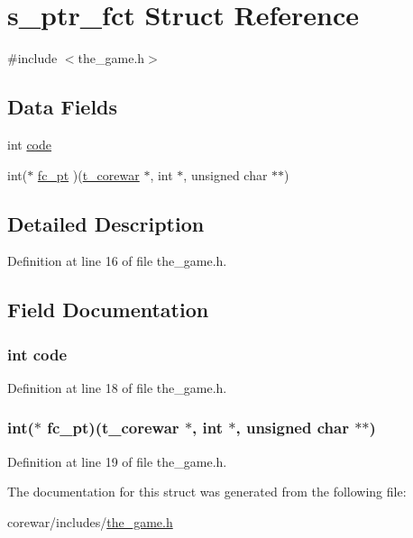 \hypertarget{structs__ptr__fct}{\section{s\-\_\-ptr\-\_\-fct Struct Reference}
\label{structs__ptr__fct}
}


{\ttfamily \#include $<$the\-\_\-game.\-h$>$}

\subsection*{Data Fields}
\begin{DoxyCompactItemize}
\item 
int \hyperlink{structs__ptr__fct_a45a5b7c00a796a23f01673cef1dbe0a9}{code}
\item 
int($\ast$ \hyperlink{structs__ptr__fct_a422cc81fc03af1b32f561010f69e33cb}{fc\-\_\-pt} )(\hyperlink{corewar_8h_a3bf9b8231c53b1073a133e549ded1777}{t\-\_\-corewar} $\ast$, int $\ast$, unsigned char $\ast$$\ast$)
\end{DoxyCompactItemize}


\subsection{Detailed Description}


Definition at line 16 of file the\-\_\-game.\-h.



\subsection{Field Documentation}
\hypertarget{structs__ptr__fct_a45a5b7c00a796a23f01673cef1dbe0a9}{
\subsubsection[{code}]{\setlength{\rightskip}{0pt plus 5cm}int code}}\label{structs__ptr__fct_a45a5b7c00a796a23f01673cef1dbe0a9}


Definition at line 18 of file the\-\_\-game.\-h.

\hypertarget{structs__ptr__fct_a422cc81fc03af1b32f561010f69e33cb}{
\subsubsection[{fc\-\_\-pt}]{\setlength{\rightskip}{0pt plus 5cm}int($\ast$ fc\-\_\-pt)({\bf t\-\_\-corewar} $\ast$, int $\ast$, unsigned char $\ast$$\ast$)}}\label{structs__ptr__fct_a422cc81fc03af1b32f561010f69e33cb}


Definition at line 19 of file the\-\_\-game.\-h.



The documentation for this struct was generated from the following file\-:\begin{DoxyCompactItemize}
\item 
corewar/includes/\hyperlink{the__game_8h}{the\-\_\-game.\-h}\end{DoxyCompactItemize}
